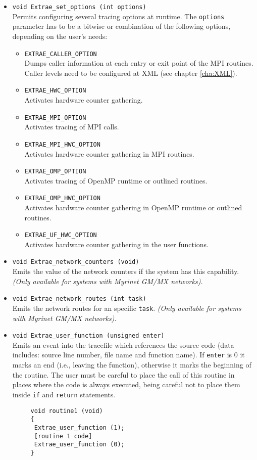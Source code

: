 \begin{itemize}
 \item {\tt void Extrae\_set\_options (int options)}\\
  Permits configuring several tracing options at runtime. The {\tt options} parameter has to be a bitwise or combination of the following options, depending on the user's needs:
  \begin{itemize}
   \item {\tt EXTRAE\_CALLER\_OPTION}\\
    Dumps caller information at each entry or exit point of the MPI routines. Caller levels need to be configured at XML (see chapter \ref{cha:XML}).
   \item {\tt EXTRAE\_HWC\_OPTION}\\
    Activates hardware counter gathering.
   \item {\tt EXTRAE\_MPI\_OPTION}\\
    Activates tracing of MPI calls.
   \item {\tt EXTRAE\_MPI\_HWC\_OPTION}\\
    Activates hardware counter gathering in MPI routines.
   \item {\tt EXTRAE\_OMP\_OPTION}\\
    Activates tracing of OpenMP runtime or outlined routines.
   \item {\tt EXTRAE\_OMP\_HWC\_OPTION}\\
    Activates hardware counter gathering in OpenMP runtime or outlined routines.
   \item {\tt EXTRAE\_UF\_HWC\_OPTION}\\
    Activates hardware counter gathering in the user functions.
  \end{itemize}

 \item {\tt void Extrae\_network\_counters (void)}\\
  Emits the value of the network counters if the system has this capability. {\em (Only available for systems with Myrinet GM/MX networks).}

 \item {\tt void Extrae\_network\_routes (int task)}\\
  Emits the network routes for an specific {\tt task}. {\em (Only available for systems with Myrinet GM/MX networks).}

 \item {\tt void Extrae\_user\_function (unsigned enter)}\\
  Emits an event into the tracefile which references the source code (data includes: source line number, file name and function name). If {\tt enter} is 0 it marks an end (i.e., leaving the function), otherwise it marks the beginning of the routine. The user must be careful to place the call of this routine in places where the code is always executed, being careful not to place them inside {\tt if} and {\tt return} statements.
    \begin{verbatim}
     void routine1 (void)
     {
      Extrae_user_function (1);
      [routine 1 code]
      Extrae_user_function (0);
     }


\end{verbatim}
\end{itemize}
